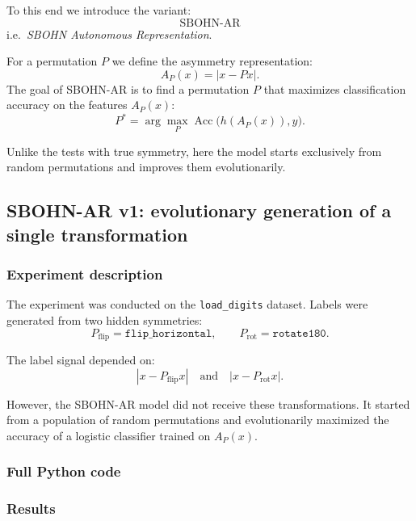 \documentclass[11pt,a4paper]{report}
\begin{document}
To this end we introduce the variant:
\[
\boxed{\mathrm{SBOHN\text{-}AR}}
\]
i.e.\ \emph{SBOHN Autonomous Representation}.

For a permutation $P$ we define the asymmetry representation:
\[
A_P(x)=|x-Px|.
\]
The goal of SBOHN-AR is to find a permutation $P$ that maximizes classification accuracy on the features $A_P(x)$:
\[
P^* = \arg\max_P \operatorname{Acc}\big(h(A_P(x)),y\big).
\]

Unlike the tests with true symmetry, here the model starts exclusively from random permutations and improves them evolutionarily.

\subsection{SBOHN-AR v1: evolutionary generation of a single transformation}

\subsubsection{Experiment description}

The experiment was conducted on the \texttt{load\_digits} dataset. Labels were generated from two hidden symmetries:
\[
P_{\mathrm{flip}}=\texttt{flip\_horizontal},
\qquad
P_{\mathrm{rot}}=\texttt{rotate180}.
\]

The label signal depended on:
\[
|x-P_{\mathrm{flip}}x|
\quad\text{and}\quad
|x-P_{\mathrm{rot}}x|.
\]

However, the SBOHN-AR model did not receive these transformations. It started from a population of random permutations and evolutionarily maximized the accuracy of a logistic classifier trained on $A_P(x)$.

\subsubsection{Full Python code}

\noindent{}


\subsubsection{Results}
\end{document}

